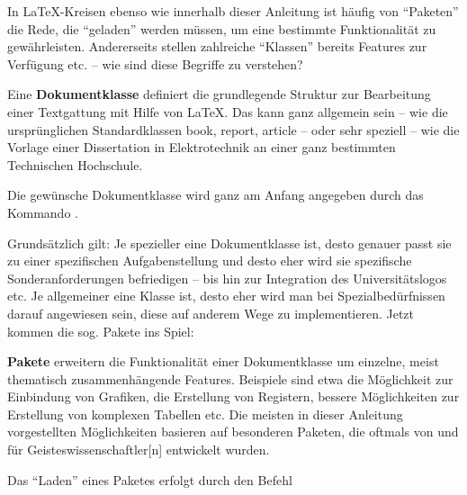 

In \LaTeX -Kreisen ebenso wie innerhalb dieser Anleitung ist häufig von \enquote{Paketen} die Rede,
die \enquote{geladen} werden müssen, um eine bestimmte Funktionalität zu gewährleisten.
Andererseits stellen zahlreiche \enquote{Klassen} bereits Features zur Verfügung etc. 
-- wie sind diese Begriffe zu verstehen?

Eine \textbf{Dokumentklasse} definiert die grundlegende Struktur zur Bearbeitung einer Textgattung
mit Hilfe von \LaTeX. Das kann ganz allgemein sein -- wie die ursprünglichen Standardklassen book, report, 
article -- oder sehr speziell -- wie die Vorlage einer Dissertation in Elektrotechnik an einer ganz
bestimmten Technischen Hochschule.

Die gewünsche Dokumentklasse wird ganz am Anfang angegeben durch das Kommando
.

Grundsätzlich gilt: Je spezieller eine Dokumentklasse ist, desto genauer passt sie zu einer spezifischen
Aufgabenstellung und desto eher wird sie spezifische Sonderanforderungen befriedigen -- bis hin zur
Integration des Universitätslogos etc.
Je allgemeiner eine Klasse ist, desto eher wird man bei Spezialbedürfnissen darauf angewiesen sein,
diese auf anderem Wege zu implementieren.
Jetzt kommen die sog. Pakete ins Spiel:

\textbf{Pakete} erweitern die Funktionalität einer %
Dokumentklasse um einzelne, meist
thematisch zusammenhängende Features. Beispiele sind etwa die Möglichkeit zur Einbindung von
Grafiken, die Erstellung von Registern, bessere Möglichkeiten zur Erstellung von komplexen Tabellen etc.
Die meisten in dieser Anleitung vorgestellten Möglichkeiten basieren auf besonderen Paketen, die
oftmals von und für Geisteswissenschaftler[n] entwickelt wurden.

Das \enquote{Laden} eines Paketes erfolgt durch den Befehl 

